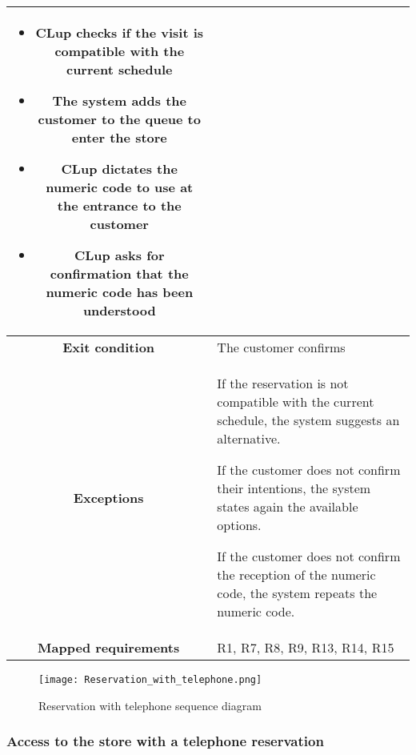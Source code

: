 \documentclass[../../main.tex]{subfiles}
\begin{document}
\begin{table}[H]
\begin{tabular}{c m{}}
\begin{itemize}
                                      \item CLup checks if the visit is compatible with the current schedule
                                      \item The system adds the customer to the queue to enter the store
                                      \item CLup dictates the numeric code to use at the entrance to the customer
                                      \item CLup asks for confirmation that the numeric code has been understood
                                    \end{itemize}\\ \hline
          \textbf{Exit condition} & The customer confirms \\ \hline
          \textbf{Exceptions} & If the reservation is not compatible with the current schedule, the system suggests an alternative.
          
                                If the customer does not confirm their intentions, the system states again the available options.
                                
                                If the customer does not confirm the reception of the numeric code, the system repeats the numeric code.\\ \hline
          \textbf{Mapped requirements} & R1, R7, R8, R9, R13, R14, R15\\ \hline
                              \end{tabular}
      \end{table}

      \begin{figure}[H]
        \centering
        \texttt{[image: Reservation\_with\_telephone.png]}
        \caption{Reservation with telephone sequence diagram}
      \end{figure}

      \subsubsection{Access to the store with a telephone reservation}
\end{document}
